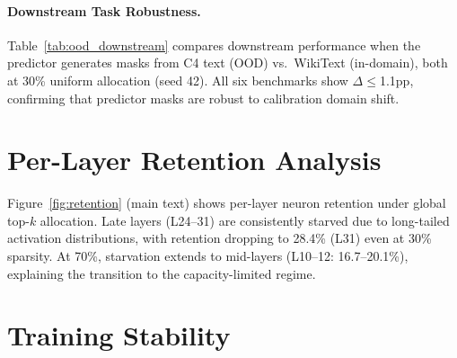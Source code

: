 \paragraph{Downstream Task Robustness.}
Table~\ref{tab:ood_downstream} compares downstream performance when the predictor generates masks from C4 text (OOD) vs.\ WikiText (in-domain), both at 30\% uniform allocation (seed 42). All six benchmarks show $\Delta$$\leq$1.1pp, confirming that predictor masks are robust to calibration domain shift. %

\begin{table}[h]
\centering
\caption{Downstream task robustness to calibration domain shift (KL 30\% uniform, seed 42). WikiText: predictor masks from in-domain text; C4: masks from OOD text. Metrics: acc\_norm (ARC-c, HS, PIQA), acc (WG, MMLU), exact\_match (GSM8K).}
\label{tab:ood_downstream}
\end{table}


\section{Per-Layer Retention Analysis}
\label{app:retention}

Figure~\ref{fig:retention} (main text) shows per-layer neuron retention under global top-$k$ allocation. Late layers (L24--31) are consistently starved due to long-tailed activation distributions, with retention dropping to 28.4\% (L31) even at 30\% sparsity. At 70\%, starvation extends to mid-layers (L10--12: 16.7--20.1\%), explaining the transition to the capacity-limited regime.


\section{Training Stability}
\label{app:stability}

